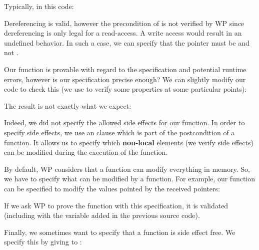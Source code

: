 Typically, in this code:






Dereferencing  is valid, however the precondition of
 is not verified by WP since dereferencing
 is only legal for a read-access. A write access would
result in an undefined behavior. In such a case, we can specify that the
pointer  must be  and not
.





Our  function is provable with regard to the specification
and potential runtime errors, however is our specification precise enough? We
can slightly modify our code to check this (we use  to
verify some properties at some particular points):






The result is not exactly what we expect:





Indeed, we did not specify the allowed side effects for our function. In
order to specify side effects, we use an  clause which is
part of the postcondition of a function. It allows us to specify which
\textbf{non-local} elements (we verify side effects) can be modified
during the execution of the function.



By default, WP considers that a function can modify everything in
memory. So, we have to specify what can be modified by a function. For
example, our  function can be specified to modify the
values pointed by the received pointers:






If we ask WP to prove the function with this specification, it is
validated (including with the variable added in the previous source
code).



Finally, we sometimes want to specify that a function is side effect
free. We specify this by giving  to
:



